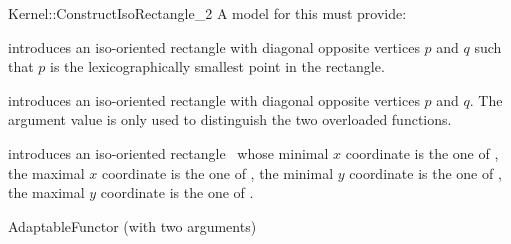 \begin{ccRefFunctionObjectConcept}{Kernel::ConstructIsoRectangle_2}
A model for this must provide:


            {introduces an iso-oriented rectangle  with diagonal
             opposite vertices $p$ and $q$ such that $p$ is the
             lexicographically smallest point in the rectangle.}

            {introduces an iso-oriented rectangle with diagonal
             opposite vertices $p$ and $q$.  The  argument value is
             only used to distinguish the two overloaded functions.
             }

            {introduces an iso-oriented rectangle \ccVar\ whose
             minimal $x$ coordinate is the one of , the
             maximal $x$ coordinate is the one of , the
             minimal $y$ coordinate is the one of , the
             maximal $y$ coordinate is the one of .}

\ccRefines
AdaptableFunctor (with two arguments)

\ccSeeAlso
{} \\

\end{ccRefFunctionObjectConcept}
